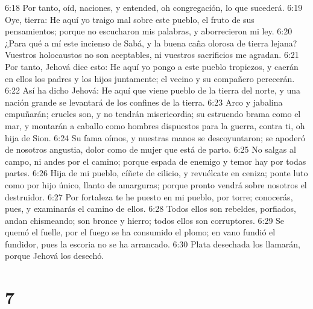 6:18 Por tanto, oíd, naciones, y entended, oh congregación, lo que sucederá.  
6:19 Oye, tierra: He aquí yo traigo mal sobre este pueblo, el fruto de sus pensamientos; porque no escucharon mis palabras, y aborrecieron mi ley.  
6:20 ¿Para qué a mí este incienso de Sabá, y la buena caña olorosa de tierra lejana? Vuestros holocaustos no son aceptables, ni vuestros sacrificios me agradan.  
6:21 Por tanto, Jehová dice esto: He aquí yo pongo a este pueblo tropiezos, y caerán en ellos los padres y los hijos juntamente; el vecino y su compañero perecerán.  
6:22 Así ha dicho Jehová: He aquí que viene pueblo de la tierra del norte, y una nación grande se levantará de los confines de la tierra.  
6:23 Arco y jabalina empuñarán; crueles son, y no tendrán misericordia; su estruendo brama como el mar, y montarán a caballo como hombres dispuestos para la guerra, contra ti, oh hija de Sion.  
6:24 Su fama oímos, y nuestras manos se descoyuntaron; se apoderó de nosotros angustia, dolor como de mujer que está de parto.  
6:25 No salgas al campo, ni andes por el camino; porque espada de enemigo y temor hay por todas partes.  
6:26 Hija de mi pueblo, cíñete de cilicio, y revuélcate en ceniza; ponte luto como por hijo único, llanto de amarguras; porque pronto vendrá sobre nosotros el destruidor.  
6:27 Por fortaleza te he puesto en mi pueblo, por torre; conocerás, pues, y examinarás el camino de ellos.  
6:28 Todos ellos son rebeldes, porfiados, andan chismeando; son bronce y hierro; todos ellos son corruptores.  
6:29 Se quemó el fuelle, por el fuego se ha consumido el plomo; en vano fundió el fundidor, pues la escoria no se ha arrancado.  
6:30 Plata desechada los llamarán, porque Jehová los desechó.  

\chapter{7}

